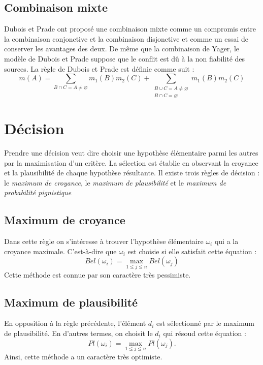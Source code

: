 \subsection{Combinaison mixte}

Dubois et Prade ont proposé une combinaison mixte comme un compromis entre la
combinaison conjonctive et la combinaison disjonctive et comme un essai de conserver
les avantages des deux. De même que la combinaison de Yager, le modèle de Dubois
et Prade suppose que le conflit est dû à la non fiabilité des sources. La règle de
Dubois et Prade est définie comme suit :
\begin{equation}
m(A) = \sum_{B \cap C = A \neq \varnothing} m_1(B) m_2(C) +
\sum_{\substack{B \cup C = A \neq \varnothing \\ B \cap C = \varnothing}} m_1(B) m_2(C)
\end{equation}

\section{Décision}

Prendre une décision veut dire choisir une hypothèse élémentaire parmi les autres
par la maximisation d'un critère. La sélection est établie en observant
la croyance et la plausibilité de chaque hypothèse résultante. Il existe trois règles
de décision : le \emph{maximum de croyance}, le \emph{maximum de plausibilité} et le
\emph{maximum de probabilité pignistique}

\subsection{Maximum de croyance}

Dans cette règle on s'intéresse à trouver l'hypothèse élémentaire $\omega_i$ qui
a la croyance maximale. C'est-à-dire que $\omega_i$ est choisie si elle satisfait cette
équation :
\begin{equation}
Bel(\omega_i) = \max_{1 \leq j \leq n} Bel(\omega_j)
\end{equation}
Cette méthode est connue par son caractère très pessimiste.

\subsection{Maximum de plausibilité}

En opposition à la règle précédente, l'élément $d_i$ est sélectionné par le maximum
de plausibilité. En d'autres termes, on choisit le $d_i$ qui résoud cette équation :
\begin{equation}
Pl(\omega_i) = \max_{1 \leq j \leq n} Pl(\omega_j).
\end{equation}
Ainsi, cette méthode a un caractère très optimiste.

